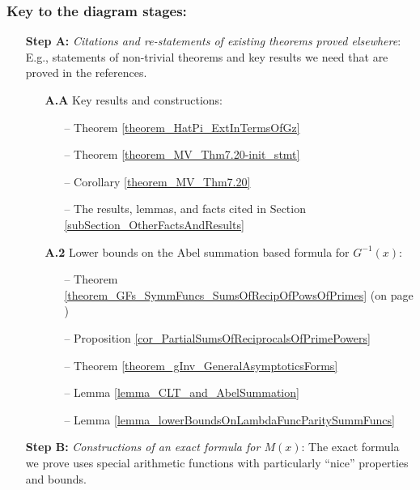 \documentclass[11pt,reqno,a4letter]{article}
\numberwithin{figure}{section}
\numberwithin{table}{section}
\theoremstyle{plain}
\numberwithin{theorem}{section}
\theoremstyle{definition}
\begin{document}
\subsubsection*{Key to the diagram stages: } 
\begin{itemize}[noitemsep,topsep=0pt]

\item[\textbf{Step A:}] \textit{Citations and re-statements of existing theorems proved elsewhere}: 
     E.g., statements of non-trivial theorems and key results we need that are proved in the references. 
     \begin{itemize}[noitemsep,topsep=0pt] 
     \item[\textbf{A.A}] Key results and constructions: 
          \begin{itemize}[noitemsep,topsep=0pt]
          \item[--] \small{Theorem \ref{theorem_HatPi_ExtInTermsOfGz}} 
          \item[--] \small{Theorem \ref{theorem_MV_Thm7.20-init_stmt}} 
          \item[--] \small{Corollary \ref{theorem_MV_Thm7.20}} 
          \item[--] \small{The results, lemmas, and facts cited in Section \ref{subSection_OtherFactsAndResults}}
          \end{itemize} 
     \item[\textbf{A.2}] Lower bounds on the Abel summation based formula for $G^{-1}(x)$: 
          \begin{itemize}[noitemsep,topsep=0pt]
          \item[--] \small{Theorem \ref{theorem_GFs_SymmFuncs_SumsOfRecipOfPowsOfPrimes} 
                    (on page \pageref{proofOf_theorem_GFs_SymmFuncs_SumsOfRecipOfPowsOfPrimes})} 
          \item[--] \small{Proposition \ref{cor_PartialSumsOfReciprocalsOfPrimePowers}} 
          \item[--] \small{Theorem \ref{theorem_gInv_GeneralAsymptoticsForms}} 
          \item[--] \small{Lemma \ref{lemma_CLT_and_AbelSummation}} 
          \item[--] \small{Lemma \ref{lemma_lowerBoundsOnLambdaFuncParitySummFuncs}} 
          \end{itemize} 
     \end{itemize} 
\item[\textbf{Step B:}] \textit{Constructions of an exact formula for $M(x)$}: The exact formula we prove 
     uses special arithmetic functions with particularly ``nice'' properties and bounds. 

\end{itemize}
\end{document}
